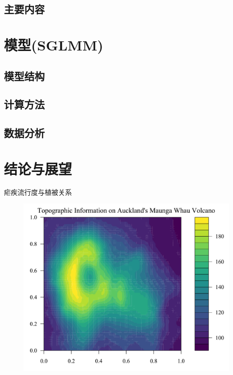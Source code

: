 \documentclass[11pt,compress,xcolor=x11names,UTF8]{ctexbeamer}
\begin{document}
\subsection{主要内容}


\section{模型(SGLMM)}

\subsection{模型结构}

\subsection{计算方法}

\subsection{数据分析}

\section{结论与展望}



\begin{frame}{疟疾流行度与植被关系}
\begin{figure}
\centering
\includegraphics[width=.75\textwidth]{volcano02}
\end{figure}
\end{frame}
\end{document}

